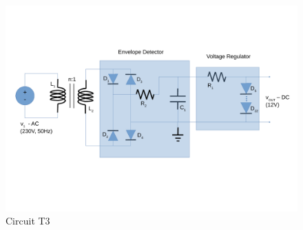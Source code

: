 \begin{figure}[h]
	\centering
	\includegraphics[width=0.85\linewidth]{dsnh_t3.pdf}
	\caption{Circuit T3}
\label{fig:Desenho_t3}
\end{figure}



